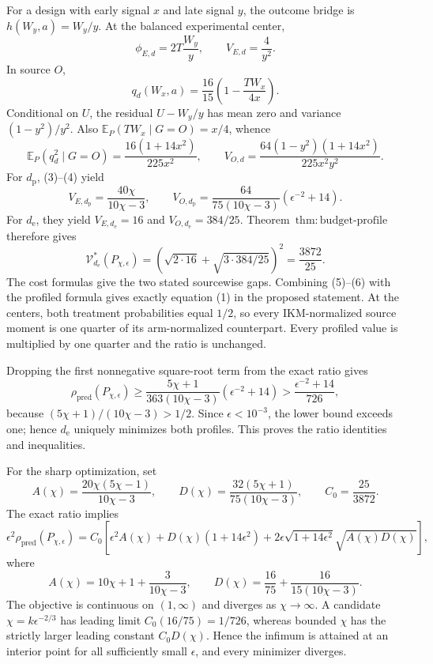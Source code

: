 For a design with early signal \(x\) and late signal \(y\), the outcome bridge is \(h(W_y,a)=W_y/y\). At the balanced experimental center,
\[
 \phi_{E,d}=2T\frac{W_y}{y},
 \qquad V_{E,d}=\frac4{y^2}. \tag{3}
\]
In source \(O\),
\[
 q_d(W_x,a)=\frac{16}{15}\left(1-\frac{TW_x}{4x}\right).
\]
Conditional on \(U\), the residual \(U-W_y/y\) has mean zero and variance \((1-y^2)/y^2\). Also \(\mathbb E_P(TW_x\mid G=O)=x/4\), whence
\[
 \mathbb E_P(q_d^2\mid G=O)=\frac{16(1+14x^2)}{225x^2},
 \qquad
 V_{O,d}=\frac{64(1-y^2)(1+14x^2)}{225x^2y^2}. \tag{4}
\]
For \(d_{\mathrm p}\), (3)--(4) yield
\[
 V_{E,d_{\mathrm p}}=\frac{40\chi}{10\chi-3},
 \qquad
 V_{O,d_{\mathrm p}}=\frac{64}{75(10\chi-3)}(\epsilon^{-2}+14). \tag{5}
\]
For \(d_{\mathrm e}\), they yield \(V_{E,d_{\mathrm e}}=16\) and \(V_{O,d_{\mathrm e}}=384/25\). Theorem~\(\mathrm{thm{:}budget\text{-}profile}\) therefore gives
\[
 \mathcal V_{d_{\mathrm e}}^*(P_{\chi,\epsilon})
 =\left(\sqrt{2\cdot16}+\sqrt{3\cdot384/25}\right)^2
 =\frac{3872}{25}. \tag{6}
\]
The cost formulas give the two stated sourcewise gaps. Combining (5)--(6) with the profiled formula gives exactly equation (1) in the proposed statement. At the centers, both treatment probabilities equal \(1/2\), so every IKM-normalized source moment is one quarter of its arm-normalized counterpart. Every profiled value is multiplied by one quarter and the ratio is unchanged.

Dropping the first nonnegative square-root term from the exact ratio gives
\[
 \rho_{\mathrm{pred}}(P_{\chi,\epsilon})
 \ge \frac{5\chi+1}{363(10\chi-3)}(\epsilon^{-2}+14)
 >\frac{\epsilon^{-2}+14}{726}, \tag{7}
\]
because \((5\chi+1)/(10\chi-3)>1/2\). Since \(\epsilon<10^{-3}\), the lower bound exceeds one; hence \(d_{\mathrm e}\) uniquely minimizes both profiles. This proves the ratio identities and inequalities.

For the sharp optimization, set
\[
 A(\chi)=\frac{20\chi(5\chi-1)}{10\chi-3},
 \qquad
 D(\chi)=\frac{32(5\chi+1)}{75(10\chi-3)},
 \qquad C_0=\frac{25}{3872}.
\]
The exact ratio implies
\[
 \epsilon^2\rho_{\mathrm{pred}}(P_{\chi,\epsilon})
 =C_0\left[\epsilon^2A(\chi)+D(\chi)(1+14\epsilon^2)
 +2\epsilon\sqrt{1+14\epsilon^2}\sqrt{A(\chi)D(\chi)}\right], \tag{8}
\]
where
\[
 A(\chi)=10\chi+1+\frac3{10\chi-3},
 \qquad
 D(\chi)=\frac{16}{75}+\frac{16}{15(10\chi-3)}. \tag{9}
\]
The objective is continuous on \((1,\infty)\) and diverges as \(\chi\to\infty\). A candidate \(\chi=k\epsilon^{-2/3}\) has leading limit \(C_0(16/75)=1/726\), whereas bounded \(\chi\) has the strictly larger leading constant \(C_0D(\chi)\). Hence the infimum is attained at an interior point for all sufficiently small \(\epsilon\), and every minimizer diverges.

